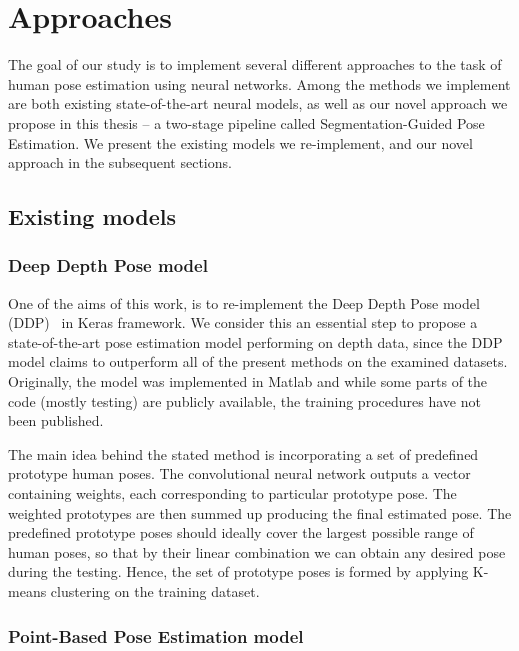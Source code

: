 \section{Approaches}
The goal of our study is to implement several different approaches to the task of human pose estimation using neural networks. Among the methods we implement are both existing state-of-the-art neural models, as well as our novel approach we propose in this thesis – a two-stage pipeline called Segmentation-Guided Pose Estimation. We present the existing models we re-implement, and our novel approach in the subsequent sections.

\subsection{Existing models}

\subsubsection{Deep Depth Pose model}
One of the aims of this work, is to re-implement the Deep Depth Pose model (DDP)~\cite{Marin18jvcir} in Keras framework. We consider this an essential step to propose a state-of-the-art pose estimation model performing on depth data, since the DDP model claims to outperform all of the present methods on the examined datasets. Originally, the model was implemented in Matlab and while some parts of the code (mostly testing) are publicly available, the training procedures have not been published.\par
\vspace{5mm}
\noindent
The main idea behind the stated method is incorporating a set of predefined prototype human poses. The convolutional neural network outputs a vector containing weights, each corresponding to particular prototype pose. The weighted prototypes are then summed up producing the final estimated pose. The predefined prototype poses should ideally cover the largest possible range of human poses, so that by their linear combination we can obtain any desired pose during the testing. Hence, the set of prototype poses is formed by applying K-means clustering on the training dataset.

\subsubsection{Point-Based Pose Estimation model}

